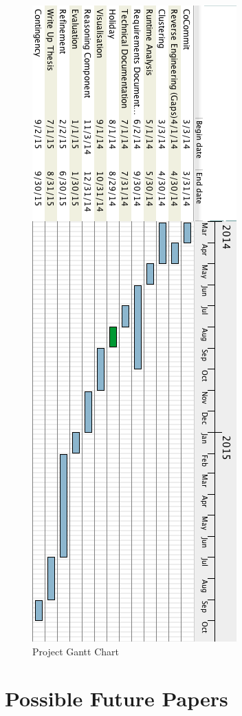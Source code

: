 \begin{figure}[htb!]
\centering
\includegraphics[scale=0.6]{sections/future/ProjectPlan-Rotate}
\caption{Project Gantt Chart}
\label{fig-future-gantt}
\end{figure}

\section{Possible Future Papers}


